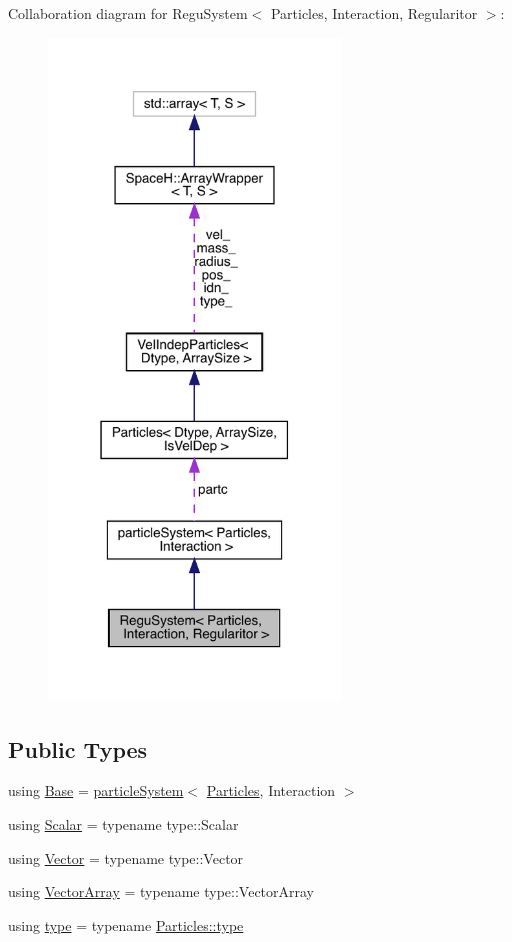 Collaboration diagram for Regu\+System$<$ Particles, Interaction, Regularitor $>$\+:
\nopagebreak
\begin{figure}[H]
\begin{center}
\leavevmode
\includegraphics[width=220pt]{class_regu_system__coll__graph}
\end{center}
\end{figure}
\subsection*{Public Types}
\begin{DoxyCompactItemize}
\item 
using \mbox{\hyperlink{class_regu_system_a03193786fed192f0c8563b38bc883d63}{Base}} = \mbox{\hyperlink{classparticle_system}{particle\+System}}$<$ \mbox{\hyperlink{struct_particles}{Particles}}, Interaction $>$
\item 
using \mbox{\hyperlink{class_regu_system_afa2cfdbfed4cc8fa879ca715c78ff240}{Scalar}} = typename type\+::\+Scalar
\item 
using \mbox{\hyperlink{class_regu_system_a6c75e2d741a21cb84370c9eb99478cf0}{Vector}} = typename type\+::\+Vector
\item 
using \mbox{\hyperlink{class_regu_system_aee47d9ea108b683a9cad9193c42786b6}{Vector\+Array}} = typename type\+::\+Vector\+Array
\item 
using \mbox{\hyperlink{class_regu_system_a7919ed2c8b419f26da20a3bd43ba5fcd}{type}} = typename \mbox{\hyperlink{class_vel_indep_particles_a0c62b43c2f0a50565e5e06587fddee18}{Particles\+::type}}
\end{DoxyCompactItemize}
